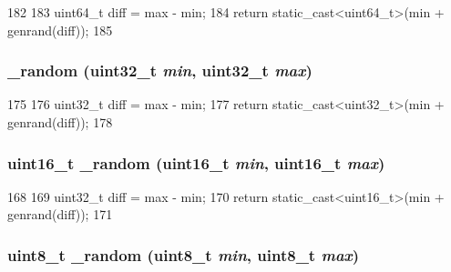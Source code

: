 \begin{DoxyCode}
182     {
183         uint64_t diff = max - min;
184         return static_cast<uint64_t>(min + genrand(diff));
185     }
\end{DoxyCode}
\hypertarget{classRandom_a65bcfbbebf2cf7c4240adf2683747838}{
\subsubsection[{\_\-random}]{ \_\-random ({\bf uint32\_\-t} {\em min}, \/  {\bf uint32\_\-t} {\em max})}}
\label{classRandom_a65bcfbbebf2cf7c4240adf2683747838}



\begin{DoxyCode}
175     {
176         uint32_t diff = max - min;
177         return static_cast<uint32_t>(min + genrand(diff));
178     }
\end{DoxyCode}
\hypertarget{classRandom_a0d783614df02f847c8eeaef14a8d271c}{
\subsubsection[{\_\-random}]{\setlength{\rightskip}{0pt plus 5cm}uint16\_\-t \_\-random (uint16\_\-t {\em min}, \/  uint16\_\-t {\em max})}}
\label{classRandom_a0d783614df02f847c8eeaef14a8d271c}



\begin{DoxyCode}
168     {
169         uint32_t diff = max - min;
170         return static_cast<uint16_t>(min + genrand(diff));
171     }
\end{DoxyCode}
\hypertarget{classRandom_a0aef2bd382874c768a598ac67d8f0522}{
\subsubsection[{\_\-random}]{\setlength{\rightskip}{0pt plus 5cm}uint8\_\-t \_\-random (uint8\_\-t {\em min}, \/  uint8\_\-t {\em max})}}
\label{classRandom_a0aef2bd382874c768a598ac67d8f0522}



